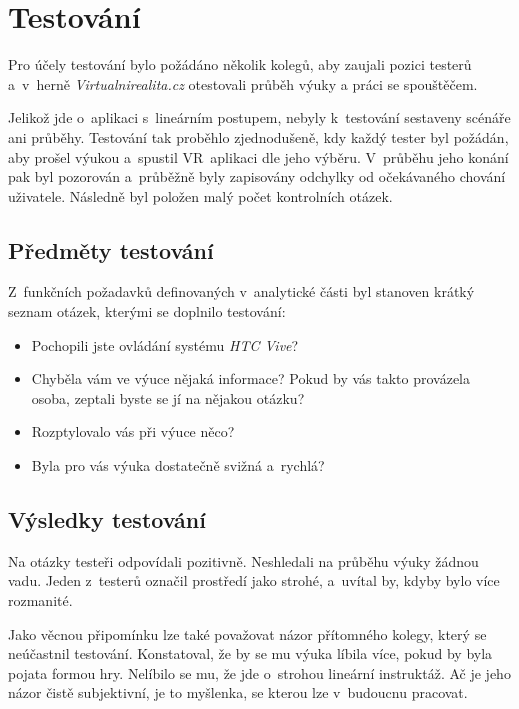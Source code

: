 \chapter{Testování}\label{testovuxe1nuxed}

Pro účely testování bylo požádáno několik kolegů, aby zaujali pozici
testerů a~v~herně \emph{Virtualnirealita.cz} otestovali průběh výuky a
práci se spouštěčem.

Jelikož jde o~aplikaci s~lineárním postupem, nebyly k~testování
sestaveny scénáře ani průběhy. Testování tak proběhlo zjednodušeně, kdy
každý tester byl požádán, aby prošel výukou a~spustil VR~aplikaci dle
jeho výběru. V~průběhu jeho konání pak byl pozorován a~průběžně
byly zapisovány odchylky od očekávaného chování uživatele. Následně byl položen
malý počet kontrolních otázek.

\section{Předměty testování}\label{pux159edmux11bty-testovuxe1nuxed}

Z~funkčních požadavků definovaných v~analytické části byl stanoven
krátký seznam otázek, kterými se doplnilo testování:

\begin{itemize}
  \item
    Pochopili jste ovládání systému \emph{HTC Vive}?
  \item
    Chyběla vám ve výuce nějaká informace? Pokud by vás takto provázela osoba,
    zeptali byste se jí na nějakou otázku?
  \item
    Rozptylovalo vás při výuce něco?
  \item
    Byla pro vás výuka dostatečně svižná a~rychlá?
\end{itemize}
    
\section{Výsledky testování}\label{vysledky-testovani}

Na otázky testeři odpovídali pozitivně. Neshledali na průběhu výuky
žádnou vadu. Jeden z~testerů označil prostředí jako strohé, a~uvítal by,
kdyby bylo více rozmanité.

Jako věcnou připomínku lze také považovat názor přítomného kolegy, který se
neúčastnil testování. Konstatoval, že by se mu výuka líbila více, pokud by byla
pojata formou hry. Nelíbilo se mu, že jde o~strohou lineární instruktáž. Ač je
jeho názor čistě subjektivní, je to myšlenka, se kterou lze v~budoucnu pracovat.

